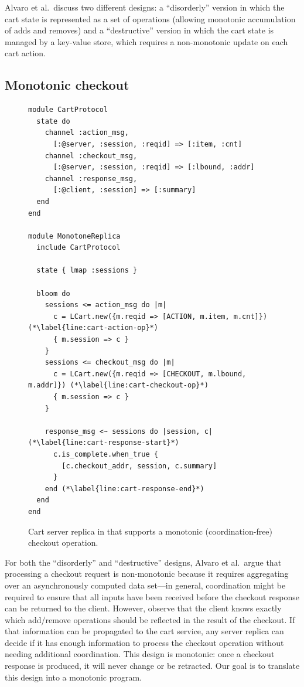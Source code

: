 Alvaro et al.\ discuss two different designs: a ``disorderly'' version in which
the cart state is represented as a set of operations (allowing monotonic
accumulation of adds and removes) and a ``destructive'' version in which the
cart state is managed by a key-value store, which requires a non-monotonic
update on each cart action.

\subsection{Monotonic checkout}
\label{sec:monotone-checkout}

\begin{figure}[t]
\begin{scriptsize}

\begin{lstlisting}
module CartProtocol
  state do
    channel :action_msg,
      [:@server, :session, :reqid] => [:item, :cnt]
    channel :checkout_msg,
      [:@server, :session, :reqid] => [:lbound, :addr]
    channel :response_msg,
      [:@client, :session] => [:summary]
  end
end

module MonotoneReplica
  include CartProtocol

  state { lmap :sessions }

  bloom do
    sessions <= action_msg do |m|
      c = LCart.new({m.reqid => [ACTION, m.item, m.cnt]}) (*\label{line:cart-action-op}*)
      { m.session => c }
    }
    sessions <= checkout_msg do |m|
      c = LCart.new({m.reqid => [CHECKOUT, m.lbound, m.addr]}) (*\label{line:cart-checkout-op}*)
      { m.session => c }
    }

    response_msg <~ sessions do |session, c| (*\label{line:cart-response-start}*)
      c.is_complete.when_true {
        [c.checkout_addr, session, c.summary]
      }
    end (*\label{line:cart-response-end}*)
  end
end
\end{lstlisting}
\end{scriptsize}
\caption{Cart server replica in \lang that supports a monotonic
  (coordination-free) checkout operation.}
\label{fig:monotone-cart}
\end{figure}

For both the ``disorderly'' and ``destructive'' designs, Alvaro et al.\ argue
that processing a checkout request is non-monotonic because it requires
aggregating over an asynchronously computed data set---in general, coordination
might be required to ensure that all inputs have been received before the
checkout response can be returned to the client. However, observe that the
client knows exactly which add/remove operations should be reflected in the
result of the checkout. If that information can be propagated to the cart
service, any server replica can decide if it has enough information to process
the checkout operation without needing additional coordination. This design is
monotonic: once a checkout response is produced, it will never change or be
retracted. Our goal is to translate this design into a monotonic \lang program.

